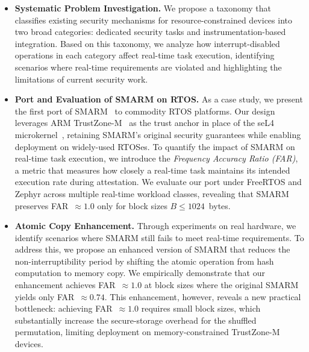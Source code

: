 \documentclass[a4paper,10pt]{article}
\begin{document}
\begin{itemize}
    \item \textbf{Systematic Problem Investigation.} We propose a
    taxonomy that classifies existing security mechanisms for
    resource-constrained devices into two broad categories: dedicated
    security tasks and instrumentation-based integration. Based on
    this taxonomy, we analyze how interrupt-disabled operations in
    each category affect real-time task execution, identifying
    scenarios where real-time requirements are violated and
    highlighting the limitations of current security work.

    \item \textbf{Port and Evaluation of SMARM on RTOS.} As a case study,
    we present the first port of SMARM~\cite{carpent2018smarm} to
    commodity RTOS platforms. Our design leverages ARM
    TrustZone-M~\cite{trustzone2025} as the trust anchor in place of
    the seL4 microkernel~\cite{klein2009sel4}, retaining SMARM's
    original security guarantees while enabling deployment on
    widely-used RTOSes. To quantify the impact of SMARM on
    real-time task execution, we introduce the \emph{Frequency
    Accuracy Ratio (FAR)}, a metric that measures how closely a
    real-time task maintains its intended execution rate during
    attestation. We evaluate our port under FreeRTOS and Zephyr
    across multiple real-time workload classes, revealing that SMARM
    preserves FAR~$\approx 1.0$ only for block sizes
    $B \leq 1024$~bytes.

    \item \textbf{Atomic Copy Enhancement.} Through experiments on
    real hardware, we identify scenarios where SMARM still fails to
    meet real-time requirements. To address this, we propose an
    enhanced version of SMARM that reduces the non-interruptibility
    period by shifting the atomic operation from hash computation to
    memory copy. We empirically demonstrate that our enhancement
    achieves FAR~$\approx 1.0$ at block sizes where the original
    SMARM yields only FAR~$\approx 0.74$. This enhancement, however,
    reveals a new practical bottleneck: achieving FAR~$\approx 1.0$
    requires small block sizes, which substantially increase the
    secure-storage overhead for the shuffled permutation, limiting
    deployment on memory-constrained TrustZone-M devices.


\end{itemize}
\end{document}
